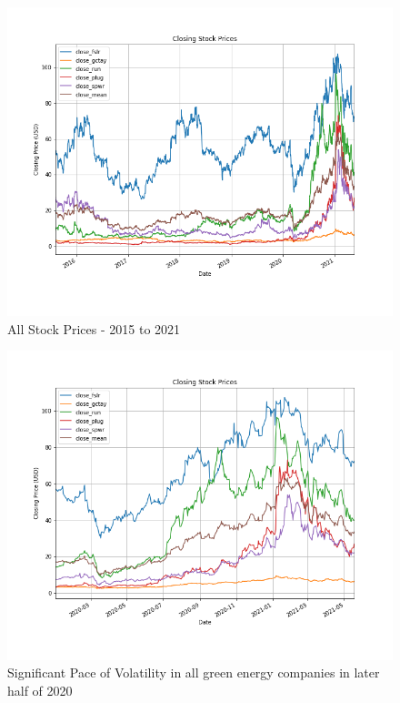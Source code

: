 \documentclass[sigconf, nonacm]{acmart}
\begin{document}
\begin{figure}[H]
  \centering
  \includegraphics[width=\linewidth]{all_stock_prices_and_mean/all_stock_prices_2015_2021.png}
  \caption{All Stock Prices - 2015 to 2021}
\end{figure}
\begin{figure}[H]
  \centering
  \includegraphics[width=\linewidth]{all_stock_prices_and_mean/all_stock_prices_2020_2021.png}
  \caption{Significant Pace of Volatility in all green energy companies in later half of 2020}
\end{figure}
\end{document}
